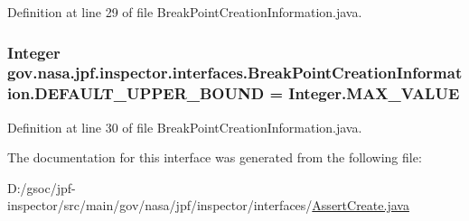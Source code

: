Definition at line 29 of file Break\+Point\+Creation\+Information.\+java.

\subsubsection[{\texorpdfstring{D\+E\+F\+A\+U\+L\+T\+\_\+\+U\+P\+P\+E\+R\+\_\+\+B\+O\+U\+ND}{DEFAULT_UPPER_BOUND}}]{\setlength{\rightskip}{0pt plus 5cm}Integer gov.\+nasa.\+jpf.\+inspector.\+interfaces.\+Break\+Point\+Creation\+Information.\+D\+E\+F\+A\+U\+L\+T\+\_\+\+U\+P\+P\+E\+R\+\_\+\+B\+O\+U\+ND = Integer.\+M\+A\+X\+\_\+\+V\+A\+L\+UE\hspace{0.3cm}{\ttfamily [inherited]}}\hypertarget{interfacegov_1_1nasa_1_1jpf_1_1inspector_1_1interfaces_1_1_break_point_creation_information_af917e7de77b2a6fc93c24e1c5a4a5759}{}\label{interfacegov_1_1nasa_1_1jpf_1_1inspector_1_1interfaces_1_1_break_point_creation_information_af917e7de77b2a6fc93c24e1c5a4a5759}


Definition at line 30 of file Break\+Point\+Creation\+Information.\+java.



The documentation for this interface was generated from the following file\+:\begin{DoxyCompactItemize}
\item 
D\+:/gsoc/jpf-\/inspector/src/main/gov/nasa/jpf/inspector/interfaces/\hyperlink{_assert_create_8java}{Assert\+Create.\+java}\end{DoxyCompactItemize}

